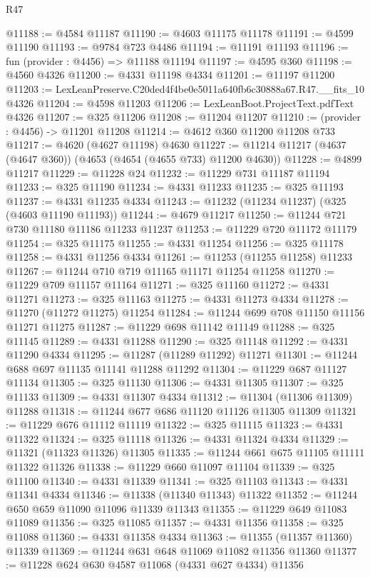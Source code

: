 \begin{lexlean}{R47}
\begin{coremodule}
@11188 := @4584 @11187
@11190 := @4603 @11175 @11178
@11191 := @4599 @11190
@11193 := @9784 @723 @4486
@11194 := @11191 @11193
@11196 := fun (provider : @4456) => @11188 @11194
@11197 := @4595 @360
@11198 := @4560 @4326
@11200 := @4331 @11198 @4334
@11201 := @11197 @11200
@11203 := LexLeanPreserve.C20ded4f4be0e5011a640fb6c30888a67.R47.__fits_10 @4326
@11204 := @4598 @11203
@11206 := LexLeanBoot.ProjectText.pdfText @4326
@11207 := @325 @11206
@11208 := @11204 @11207
@11210 := (provider : @4456) -> @11201 @11208
@11214 := @4612 @360 @11200 @11208 @733
@11217 := @4620 (@4627 @11198) @4630
@11227 := @11214 @11217 (@4637 (@4647 @360)) (@4653 (@4654 (@4655 @733) @11200 @4630))
@11228 := @4899 @11217
@11229 := @11228 @24
@11232 := @11229 @731 @11187 @11194
@11233 := @325 @11190
@11234 := @4331 @11233
@11235 := @325 @11193
@11237 := @4331 @11235 @4334
@11243 := @11232 (@11234 @11237) (@325 (@4603 @11190 @11193))
@11244 := @4679 @11217
@11250 := @11244 @721 @730 @11180 @11186 @11233 @11237
@11253 := @11229 @720 @11172 @11179
@11254 := @325 @11175
@11255 := @4331 @11254
@11256 := @325 @11178
@11258 := @4331 @11256 @4334
@11261 := @11253 (@11255 @11258) @11233
@11267 := @11244 @710 @719 @11165 @11171 @11254 @11258
@11270 := @11229 @709 @11157 @11164
@11271 := @325 @11160
@11272 := @4331 @11271
@11273 := @325 @11163
@11275 := @4331 @11273 @4334
@11278 := @11270 (@11272 @11275) @11254
@11284 := @11244 @699 @708 @11150 @11156 @11271 @11275
@11287 := @11229 @698 @11142 @11149
@11288 := @325 @11145
@11289 := @4331 @11288
@11290 := @325 @11148
@11292 := @4331 @11290 @4334
@11295 := @11287 (@11289 @11292) @11271
@11301 := @11244 @688 @697 @11135 @11141 @11288 @11292
@11304 := @11229 @687 @11127 @11134
@11305 := @325 @11130
@11306 := @4331 @11305
@11307 := @325 @11133
@11309 := @4331 @11307 @4334
@11312 := @11304 (@11306 @11309) @11288
@11318 := @11244 @677 @686 @11120 @11126 @11305 @11309
@11321 := @11229 @676 @11112 @11119
@11322 := @325 @11115
@11323 := @4331 @11322
@11324 := @325 @11118
@11326 := @4331 @11324 @4334
@11329 := @11321 (@11323 @11326) @11305
@11335 := @11244 @661 @675 @11105 @11111 @11322 @11326
@11338 := @11229 @660 @11097 @11104
@11339 := @325 @11100
@11340 := @4331 @11339
@11341 := @325 @11103
@11343 := @4331 @11341 @4334
@11346 := @11338 (@11340 @11343) @11322
@11352 := @11244 @650 @659 @11090 @11096 @11339 @11343
@11355 := @11229 @649 @11083 @11089
@11356 := @325 @11085
@11357 := @4331 @11356
@11358 := @325 @11088
@11360 := @4331 @11358 @4334
@11363 := @11355 (@11357 @11360) @11339
@11369 := @11244 @631 @648 @11069 @11082 @11356 @11360
@11377 := @11228 @624 @630 @4587 @11068 (@4331 @627 @4334) @11356

\end{coremodule}
\end{lexlean}
